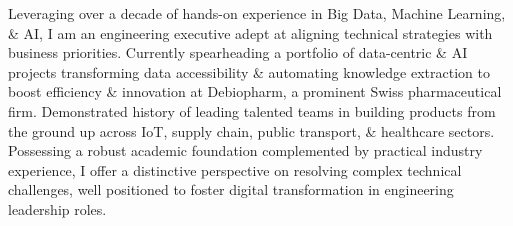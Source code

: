 

\begin{cvparagraph}

Leveraging over a decade of hands-on experience in Big Data, Machine Learning, \& AI, I am an engineering executive adept at aligning technical strategies with business priorities. 
Currently spearheading a portfolio of data-centric \& AI projects transforming data accessibility \& automating knowledge extraction to boost efficiency \& innovation at Debiopharm, a prominent Swiss pharmaceutical firm.
Demonstrated history of leading talented teams in building products from the ground up across IoT, supply chain, public transport, \& healthcare sectors.
Possessing a robust academic foundation complemented by practical industry experience, I offer a distinctive perspective on resolving complex technical challenges, well positioned to foster digital transformation in engineering leadership roles.
\end{cvparagraph}

\vspace{-0.5cm}